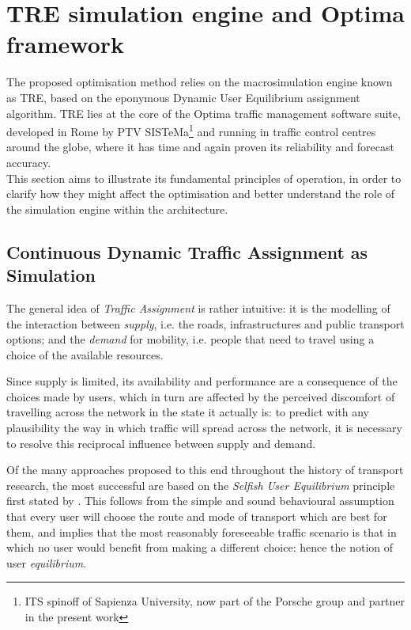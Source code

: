 \section{TRE simulation engine and Optima framework}
The proposed optimisation method relies on the macrosimulation engine known as TRE, based on the eponymous Dynamic User Equilibrium assignment algorithm.
TRE lies at the core of the Optima traffic management software suite, developed in Rome by PTV SISTeMa\footnote{ITS spinoff of Sapienza University, now part of the Porsche group and partner in the present work } and running in traffic control centres around the globe, where it has time and again proven its reliability and forecast accuracy.\\
This section aims to illustrate its fundamental principles of operation, in order to clarify how they might affect the optimisation and better understand the role of the simulation engine within the architecture.

\subsection{Continuous Dynamic Traffic Assignment as Simulation}
The general idea of \emph{Traffic Assignment} is rather intuitive: it is the modelling of the interaction between \emph{supply}, i.e. the roads, infrastructures and public transport options; and the \emph{demand} for mobility, i.e. people that need to travel using a choice of the available resources.

Since supply is limited, its availability and performance are a consequence of the choices made by users, which in turn are affected by the perceived discomfort of travelling across the network in the state it actually is: to predict with any plausibility the way in which traffic will spread across the network, it is necessary to resolve this reciprocal influence between supply and demand.

Of the many approaches proposed to this end throughout the history of transport research, the most successful are based on the \emph{Selfish User Equilibrium} principle first stated by \cite{wardrop1952}. This follows from the simple and sound behavioural assumption that every user will choose the route and mode of transport which are best for them, and implies that the most reasonably foreseeable traffic scenario is that in which no user would benefit from making a different choice: hence the notion of user \emph{equilibrium}.


